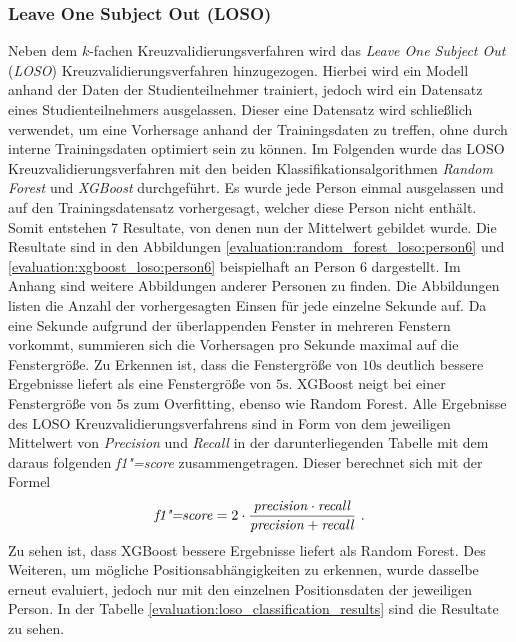\subsubsection{Leave One Subject Out (LOSO)}
Neben dem $k$-fachen Kreuzvalidierungsverfahren wird das \textit{Leave One Subject Out} (\textit{LOSO}) Kreuzvalidierungsverfahren hinzugezogen. 
Hierbei wird ein Modell anhand der Daten der Studienteilnehmer trainiert, jedoch wird ein Datensatz eines Studienteilnehmers ausgelassen. 
Dieser eine Datensatz wird schließlich verwendet, um eine Vorhersage anhand der Trainingsdaten zu treffen, ohne durch interne Trainingsdaten optimiert sein zu können.
Im Folgenden wurde das LOSO Kreuzvalidierungsverfahren mit den beiden Klassifikationsalgorithmen \textit{Random Forest} und \textit{XGBoost} durchgeführt. 
Es wurde jede Person einmal ausgelassen und auf den Trainingsdatensatz vorhergesagt, welcher diese Person nicht enthält. 
Somit entstehen 7 Resultate, von denen nun der Mittelwert gebildet wurde.
Die Resultate sind in den Abbildungen \ref{evaluation:random_forest_loso:person6} und \ref{evaluation:xgboost_loso:person6} beispielhaft an Person 6 dargestellt.
Im Anhang sind weitere Abbildungen anderer Personen zu finden.
Die Abbildungen listen die Anzahl der vorhergesagten Einsen für jede einzelne Sekunde auf. 
Da eine Sekunde aufgrund der überlappenden Fenster in mehreren Fenstern vorkommt, summieren sich die Vorhersagen pro Sekunde maximal auf die Fenstergröße.
Zu Erkennen ist, dass die Fenstergröße von $10\si{\s}$ deutlich bessere Ergebnisse liefert als eine Fenstergröße von $5\si{\s}$. 
XGBoost neigt bei einer Fenstergröße von $5\si{\s}$ zum Overfitting, ebenso wie Random Forest. 
Alle Ergebnisse des LOSO Kreuzvalidierungsverfahrens sind in Form von dem jeweiligen Mittelwert von \textit{Precision} und \textit{Recall} in der darunterliegenden Tabelle mit dem daraus folgenden \textit{f1"=score} zusammengetragen.
Dieser berechnet sich mit der Formel
\[\text{\textit{f1"=score}} = 2 \cdot \frac{\text{\textit{precision}} \cdot \text{\textit{recall}}}{\text{\textit{precision}} + \text{\textit{recall}}}\text{ .}\]
Zu sehen ist, dass XGBoost bessere Ergebnisse liefert als Random Forest.
Des Weiteren, um mögliche Positionsabhängigkeiten zu erkennen, wurde dasselbe erneut evaluiert, jedoch nur mit den einzelnen Positionsdaten der jeweiligen Person. 
In der Tabelle \ref{evaluation:loso_classification_results} sind die Resultate zu sehen.

